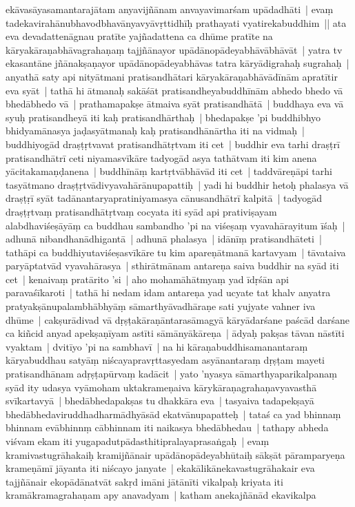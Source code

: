 \documentclass[article,12pt,a4paper]{memoir}
\begin{document}
	  \pstart ekāvasāyasamantarajātam anyavijñānam anvayavimarśam upādadhāti | evaṃ tadekavirahānubhavodbhavānyavyāvṛttidhīḥ prathayati vyatirekabuddhim || \label{thakur75-125.26} ata eva devadattenāgnau pratīte yajñadattena ca dhūme pratīte na kāryakāraṇabhāvagrahaṇaṃ tajjñānayor upādānopādeyabhāvābhāvāt | yatra tv ekasantāne jñānakṣaṇayor upādānopādeyabhāvas tatra kāryādigrahaḥ sugrahaḥ | anyathā saty api nityātmani pratisandhātari kāryakāraṇabhāvādīnām apratītir eva syāt | \label{thakur75-125.30} tathā hi ātmanaḥ sakāśāt pratisandheyabuddhīnām abhedo bhedo vā bhedābhedo vā | \label{thakur75-125.31} prathamapakṣe ātmaiva syāt pratisandhātā | buddhaya eva vā syuḥ pratisandheyā iti kaḥ pratisandhārthaḥ | \label{thakur75-125.32} bhedapakṣe 'pi buddhibhyo bhidyamānasya jaḍasyātmanaḥ kaḥ pratisandhānārtha iti na vidmaḥ | \label{thakur75-125.33} buddhiyogād draṣṭṛtvavat pratisandhātṛtvam iti cet | \label{thakur75-126.1} buddhir eva tarhi draṣṭrī pratisandhātrī ceti niyamasvīkāre tadyogād asya tathātvam iti kim anena yācitakamaṇḍanena | \label{thakur75-126.2} buddhīnāṃ kartṛtvābhāvād iti cet | \label{thakur75-126.2a} taddvāreṇāpi tarhi tasyātmano draṣṭṛtvādivyavahārānupapattiḥ | yadi hi buddhir hetoḥ phalasya vā draṣṭṛī syāt tadānantaryapratiniyamasya cānusandhātrī kalpitā | tadyogād draṣṭṛtvaṃ pratisandhātṛtvaṃ cocyata iti syād api prativiṣayam alabdhaviśeṣāyāṃ ca buddhau sambandho 'pi na viśeṣaṃ vyavahārayitum īśaḥ | adhunā nibandhanādhigantā | adhunā phalasya | idānīṃ pratisandhāteti | tathāpi ca buddhiyutaviśeṣasvīkāre tu kim apareṇātmanā kartavyam | tāvataiva paryāptatvād vyavahārasya | \label{thakur75-126.9} sthirātmānam antareṇa saiva buddhir na syād iti cet | \label{thakur75-126.9a} kenaivaṃ pratārito 'si | aho mohamāhātmyaṃ yad īdṛśān api paravaśīkaroti | tathā hi nedam idam antareṇa yad ucyate tat khalv anyatra pratyakṣānupalambhābhyāṃ sāmarthyāvadhāraṇe sati yujyate vahner iva dhūme | cakṣurādivad vā dṛṣṭakāraṇāntarasāmagyā kāryādarśane paścād darśane ca kiñcid anyad apekṣaṇīyam astīti sāmānyākāreṇa | \label{thakur75-126.14} ādyaḥ pakṣas tāvan nāstīti vyaktam | dvitīyo 'pi na sambhavī | na hi kāraṇabuddhisamanantaraṃ kāryabuddhau satyāṃ niścayapravṛttasyedam asyānantaraṃ dṛṣṭam mayeti pratisandhānam adṛṣṭapūrvaṃ kadācit | yato 'nyasya sāmarthyaparikalpanaṃ syād ity udasya vyāmoham uktakrameṇaiva kārykāraṇagrahaṇavyavasthā svīkartavyā | \label{thakur75-126.18} bhedābhedapakṣas tu dhakkāra eva | tasyaiva tadapekṣayā bhedābhedaviruddhadharmādhyāsād ekatvānupapatteḥ | tataś ca yad bhinnaṃ bhinnam evābhinnṃ cābhinnam iti naikasya bhedābhedau | tathapy abheda viśvam ekam iti yugapadutpādasthitipralayaprasaṅgaḥ | \label{thakur75-126.20} evaṃ kramivastugrāhakaiḥ kramijñānair upādānopādeyabhūtaiḥ sākṣāt pāramparyeṇa krameṇāmī jāyanta iti niścayo janyate | ekakālikānekavastugrāhakair eva tajjñānair ekopādānatvāt sakṛd imāni jātānīti vikalpaḥ kriyata iti kramākramagrahaṇam apy anavadyam | \label{thakur75-126.24} katham anekajñānād ekavikalpa 
\end{document}
